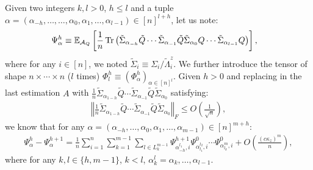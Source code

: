 \documentclass[a4papaer, titlepage]{book}
\begin{document}
  Given two integers $k, l>0$, $h\leq l$ and a tuple $\alpha = (\alpha_{-h},\ldots, \ldots, \alpha_{0},\alpha_{1},\ldots, \alpha_{l-1}) \in [n]^{l+h}$, let us note:
  \begin{align*}
    \Psi_\alpha^h &\equiv  \mathbb E_{\mathcal A_Q}  \left[ \frac{1}{n} \operatorname{Tr} \left( \tilde \Sigma_{\alpha_{-h}}\tilde Q \cdots   \tilde \Sigma_{\alpha_{-1}}\tilde Q\tilde \Sigma_{\alpha_0} Q \cdots \tilde \Sigma_{\alpha_{l-1}} Q\right) \right],
  \end{align*}
  where for any $i \in[n]$, we noted $\tilde \Sigma_i \equiv \Sigma_i/\tilde \Lambda_i^z$.
  We further introduce the tensor of shape $n \times \cdots \times n$ ($l$ times) $\Phi_l^h \equiv \left( \Phi_\alpha^h \right)_{\alpha \in [n]^l}$.
  Given $h>0$ and replacing in the last estimation $A$ with $\frac{1}{n}\tilde\Sigma_{\alpha_{1-h}}\tilde Q \cdots \tilde\Sigma_{\alpha_{-1}}\tilde Q\tilde\Sigma_{\alpha_0}$ satisfying:
  \begin{align*}
     \left\Vert \frac{1}{n}\tilde \Sigma_{\alpha_{1-h}}\tilde Q \cdots \tilde \Sigma_{\alpha_{-1}}\tilde Q\tilde \Sigma_{\alpha_0} \right\Vert_F \leq O \left( \frac{1}{\sqrt n} \right),
   \end{align*}
    we know that for any $\alpha =(\alpha_{-h},\ldots,\alpha_0,\alpha_1,\ldots, \alpha_{m-1}) \in [n]^{m+h}$:
  \begin{align*}
    \Psi_\alpha^h - \Psi_\alpha^{h+1}
    = \frac{1}{n} \sum_{i=1}^n\sum_{k=1}^{m-1}\sum_{l\in L_k^{m-1}} \Psi^{h+1}_{\alpha_{-h}^{l_1}, i} \Psi^0_{\alpha_{l_1}^{l_2}, i}\cdots \Psi^0_{\alpha_{l_k}^m, i} + O\left( \frac{(c\kappa_z)^{m}}{n} \right),
  \end{align*}
  where for any $k,l \in \{h, m-1\}$, $k<l$, $\alpha_k^l = \alpha_k,\ldots, \alpha_{l-1}$.
\end{document}
